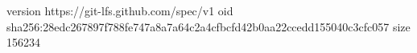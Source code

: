 version https://git-lfs.github.com/spec/v1
oid sha256:28edc267897f788fe747a8a7a64c2a4cfbcfd42b0aa22ccedd155040c3cfc057
size 156234
